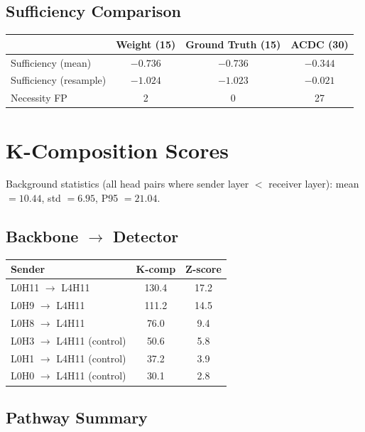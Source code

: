 \documentclass{article}
\begin{document}
\begin{appendices}
\subsection{Sufficiency Comparison}

\begin{table}[h]
\centering
\begin{tabular}{lccc}
\toprule
& \textbf{Weight (15)} & \textbf{Ground Truth (15)} & \textbf{ACDC (30)} \\
\midrule
Sufficiency (mean) & $-0.736$ & $-0.736$ & $-0.344$ \\
Sufficiency (resample) & $-1.024$ & $-1.023$ & $-0.021$ \\
Necessity FP & 2 & 0 & 27 \\
\bottomrule
\end{tabular}
\end{table}


\section{K-Composition Scores}
\label{app:kcomp}

Background statistics (all head pairs where sender layer $<$ receiver
layer): mean $= 10.44$, std $= 6.95$, P95 $= 21.04$.

\subsection{Backbone $\to$ Detector}

\begin{table}[h]
\centering
\begin{tabular}{lcc}
\toprule
\textbf{Sender} & \textbf{K-comp} & \textbf{Z-score} \\
\midrule
L0H11 $\to$ L4H11 & 130.4 & 17.2 \\
L0H9 $\to$ L4H11 & 111.2 & 14.5 \\
L0H8 $\to$ L4H11 & 76.0 & 9.4 \\
\midrule
L0H3 $\to$ L4H11 (control) & 50.6 & 5.8 \\
L0H1 $\to$ L4H11 (control) & 37.2 & 3.9 \\
L0H0 $\to$ L4H11 (control) & 30.1 & 2.8 \\
\bottomrule
\end{tabular}
\end{table}

\subsection{Pathway Summary}


\end{appendices}
\end{document}
